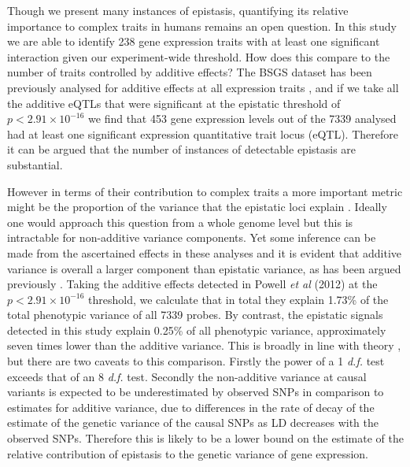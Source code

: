 \documentclass{article}
\begin{document}
Though we present many instances of epistasis, quantifying its relative importance to complex traits in humans remains an open question. In this study we are able to identify 238 gene expression traits with at least one significant interaction given our experiment-wide threshold. How does this compare to the number of traits controlled by additive effects? The BSGS dataset has been previously analysed for additive effects at all expression traits \cite{Powell2012}, and if we take all the additive eQTLs that were significant at the epistatic threshold of $p < 2.91 \times 10^{-16}$ we find that 453 gene expression levels out of the 7339 analysed had at least one significant expression quantitative trait locus (eQTL). Therefore it can be argued that the number of instances of detectable epistasis are substantial.

However in terms of their contribution to complex traits a more important metric might be the proportion of the variance that the epistatic loci explain \cite{Hill2008a}. Ideally one would approach this question from a whole genome level \cite{Visscher2008} but this is intractable for non-additive variance components. Yet some inference can be made from the ascertained effects in these analyses and it is evident that additive variance is overall a larger component than epistatic variance, as has been argued previously \cite{Hill2008a, Crow2010}. Taking the additive effects detected in Powell \emph{et al} (2012) at the $p < 2.91 \times 10^{-16}$ threshold, we calculate that in total they explain 1.73\% of the total phenotypic variance of all 7339 probes. By contrast, the epistatic signals detected in this study explain 0.25\% of all phenotypic variance, approximately seven times lower than the additive variance. This is broadly in line with theory \cite{Hill2008a}, but there are two caveats to this comparison. Firstly the power of a 1 \emph{d.f.} test exceeds that of an 8 \emph{d.f.} test. Secondly the non-additive variance at causal variants is expected to be underestimated by observed SNPs in comparison to estimates for additive variance, due to differences in the rate of decay of the estimate of the genetic variance of the causal SNPs as LD decreases with the observed SNPs. Therefore this is likely to be a lower bound on the estimate of the relative contribution of epistasis to the genetic variance of gene expression.
\end{document}
